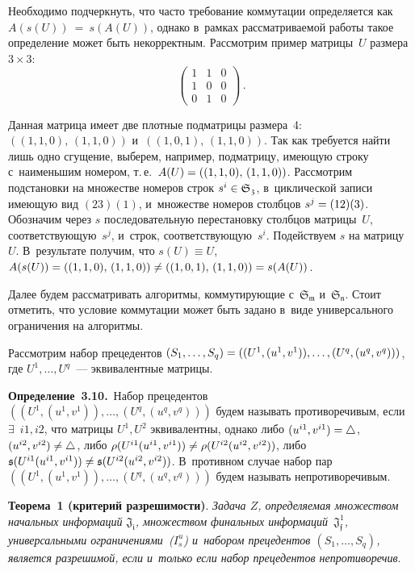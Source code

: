 \begin{multicols}{2}
\smallskip

Необходимо подчеркнуть, что часто требование коммутации определяется как 
$A(s(U))~=~s(A(U))$, однако в~рамках рассматриваемой работы такое определение 
может быть некорректным. Рас\-смот\-рим пример матрицы~$U$ размера $3\times 3$:
$$
\begin{pmatrix}
 1 & 1 & 0\\ 
 1 & 0 & 0
  \\  0 & 1 & 0
  \end{pmatrix}\,.
  $$

Данная матрица имеет две плотные подматрицы размера~4: $((1,1,0),\, (1,1,0))$ 
и~$((1,0,1),\, (1,1,0))$. Так как требуется найти лишь одно сгущение, выберем, 
например, подматрицу, имеющую строку с~наименьшим номером, т.\,е.\ 
$A(U)\hm=((1,1,0),\, (1,1,0))$. Рассмотрим подстановки на множестве номеров строк 
$s^i \hm\in \mathfrak{S_3}$, в~циклической записи имеющую вид $(23)(1)$, 
и~множестве номеров столбцов $s^j \hm= (12)(3)$. Обозначим через $s$ последовательную 
перестановку столбцов матрицы~$U$, соответствующую~$s^j$, и~строк, 
соответствующую~$s^i$. Подействуем $s$ на матрицу~$U$. В~результате получим, что 
$s(U)\equiv U$, $A(s(U))\hm=  ((1,1,0),\, (1,1,0))\hm\ne ((1,0,1),\, 
(1,1,0)) \hm= s(A(U))$.

Далее будем рассматривать алгоритмы, коммутирующие с~$\mathfrak{S_m}$ 
и~$\mathfrak{S_n}$. Стоит отметить, что условие коммутации может быть задано 
в~виде универсального ограничения на алгоритмы.

Рассмотрим набор прецедентов $(S_1,\ldots,S_q) \hm= ((U^1, (u^1,v^1)),\ldots,
(U^q, (u^q,v^q)))$, где $U^1, \ldots, U^q$~--- эквивалентные 
матрицы.

\smallskip

\noindent
\textbf{Определение~3.10.}\
Набор прецедентов $((U^1, (u^1,v^1)),\ldots,(U^q, (u^q,v^q)))$ будем называть 
противоречивым, если $\exists$\ $i1, i2$, что матрицы $U^1, U^2$ эквивалентны, 
однако
либо $(u^{i1},v^{i1})\hm=\triangle$, $(u^{i2},v^{i2})\hm\ne\triangle$,  либо 
$\rho(U^{i1}(u^{i1},v^{i1}))\hm\ne \rho(U^{i2}(u^{i2},v^{i2}))$, либо 
$\mathfrak{s}(U^{i1}(u^{i1},v^{i1})) \hm\ne \mathfrak{s}(U^{i2}(u^{i2},v^{i2}))$. 
В~противном случае набор пар $((U^1, (u^1,v^1)),\ldots,(U^q, (u^q,v^q)))$ будем 
называть непротиворечивым.


\smallskip

\noindent
\textbf{Теорема~1 (критерий разрешимости)}.
\textit{Задача $Z$, определяемая 
множеством начальных информаций $\mathfrak{J_i}$, множеством финальных 
информаций~$\mathfrak{J_{f}^1}$, универсальными ограничениями~($I_s^u$) 
и~набором прецедентов  $(S_1,\ldots,S_q)$, является разрешимой, если и~только если 
набор прецедентов непротиворечив}.


\end{multicols}
